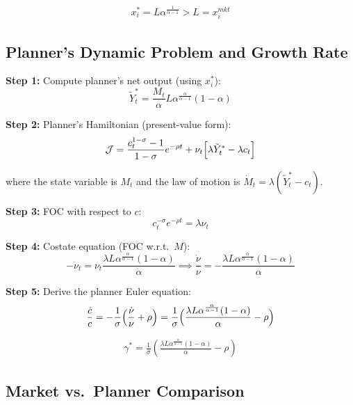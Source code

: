 \documentclass[a4paper,11pt]{article}
\begin{document}
\begin{resultbox}
\begin{align*}
x_i^* = L \alpha^{\frac{1}{\alpha-1}} > L = x_i^{mkt}
\tag{Planner Static}
\end{align*}
\end{resultbox}

\subsection*{Planner's Dynamic Problem and Growth Rate}

\begin{derivationbox}
\textbf{Step 1:} Compute planner's net output (using $x_i^*$):
\[
\tilde{Y}_t^* = \frac{M_t}{\alpha} L \alpha^{\frac{\alpha}{\alpha-1}} (1-\alpha)
\]

\textbf{Step 2:} Planner's Hamiltonian (present-value form):
\[
\mathcal{J} = \frac{c_t^{1-\sigma}-1}{1-\sigma} e^{-\rho t} + \nu_t \Bigl[\lambda \tilde{Y}_t^* - \lambda c_t\Bigr]
\]

where the state variable is $M_t$ and the law of motion is $\dot{M}_t = \lambda(\tilde{Y}_t^* - c_t)$.

\textbf{Step 3:} FOC with respect to $c$:
\[
c_t^{-\sigma} e^{-\rho t} = \lambda \nu_t
\]

\textbf{Step 4:} Costate equation (FOC w.r.t.\ $M$):
\[
-\dot{\nu}_t = \nu_t \frac{\lambda L \alpha^{\frac{\alpha}{\alpha-1}}(1-\alpha)}{\alpha}
\implies \frac{\dot{\nu}}{\nu} = -\frac{\lambda L \alpha^{\frac{\alpha}{\alpha-1}}(1-\alpha)}{\alpha}
\]

\textbf{Step 5:} Derive the planner Euler equation:
\[
\frac{\dot{c}}{c} = -\frac{1}{\sigma}\Bigl(\frac{\dot{\nu}}{\nu} + \rho\Bigr)
= \frac{1}{\sigma}\Bigl(\frac{\lambda L \alpha^{\frac{\alpha}{\alpha-1}}(1-\alpha)}{\alpha} - \rho\Bigr)
\]
\end{derivationbox}

\begin{resultbox}
\begin{align*}
\boxed{\gamma^* = \frac{1}{\sigma}\left(\frac{\lambda L \alpha^{\frac{\alpha}{\alpha-1}}(1-\alpha)}{\alpha} - \rho\right)}
\tag{Planner Growth}
\end{align*}
\end{resultbox}

\subsection*{Market vs.\ Planner Comparison}
\end{document}
